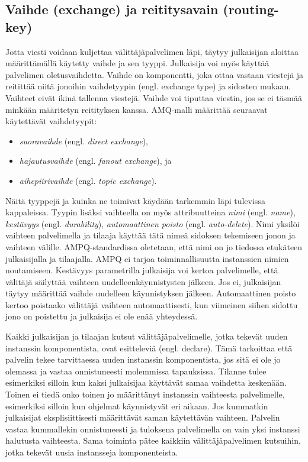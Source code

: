 \subsection{Vaihde (exchange) ja reititysavain (routing-key)}
Jotta viesti voidaan kuljettaa välittäjäpalvelimen läpi, täytyy julkaisijan aloittaa määrittämällä käytetty vaihde ja sen tyyppi. Julkaisija voi myös käyttää palvelimen oletusvaihdetta. Vaihde on komponentti, joka ottaa vastaan viestejä ja reitittää niitä jonoihin vaihdetyypin (engl. exchange type) ja sidosten mukaan. Vaihteet eivät ikinä tallenna viestejä. Vaihde voi tiputtaa viestin, jos se ei täsmää minkään määritetyn reitityksen kanssa. AMQ-malli määrittää seuraavat käytettävät vaihdetyypit:
\begin{itemize}
	\item \emph{suoravaihde} (engl. \emph{direct exchange}),
	\item \emph{hajautusvaihde} (engl. \emph{fanout exchange}), ja
	\item \emph{aihepiirivaihde} (engl. \emph{topic exchange}).
\end{itemize}

Näitä tyyppejä ja kuinka ne toimivat käydään tarkemmin läpi tulevissa kappaleissa. Tyypin lisäksi vaihteella on myös attribuutteina \emph{nimi} (engl. \emph{name}), \emph{kestävyys} (engl. \emph{durability}), \emph{automaattinen poisto} (engl. \emph{auto-delete}). Nimi yksilöi vaihteen palvelimella ja tilaaja käyttää tätä nimeä sidoksen tekemiseen jonon ja vaihteen välille. AMPQ-standardissa oletetaan, että nimi on jo tiedossa etukäteen julkaisijalla ja tilaajalla. AMPQ ei tarjoa toiminnallisuutta instanssien nimien noutamiseen. Kestävyys parametrilla julkaisija voi kertoa palvelimelle, että välitäjä säilyttää vaihteen uudelleenkäynnistysten jälkeen. Jos ei, julkaisijan täytyy määrittää vaihde uudelleen käynnistyksen jälkeen. Automaattinen poisto kertoo poistaako välittäjä vaihteen automaattisesti, kun viimeinen siihen sidottu jono on poistettu ja julkaisija ei ole enää yhteydessä.

Kaikki julkaisijan ja tilaajan kutsut välittäjäpalvelimelle, jotka tekevät uuden instanssin komponentista, ovat esitteleviä (engl. declare). Tämä tarkoittaa että palvelin tekee tarvittaessa uuden instanssin komponentista, jos sitä ei ole jo olemassa ja vastaa onnistuneesti molemmissa tapauksissa. Tilanne tulee esimerkiksi silloin kun kaksi julkaisijaa käyttävät samaa vaihdetta keskenään. Toinen ei tiedä onko toinen jo määrittänyt instanssin vaihteesta palvelimelle, esimerkiksi silloin kun ohjelmat käynnistyvät eri aikaan. Jos kummatkin julkaisijat eksplisiittisesti määrittävät saman käytettävän vaihteen. Palvelin vastaa kummallekin onnistuneesti ja tuloksena palvelimella on vain yksi instanssi halutusta vaihteesta. Sama toiminta pätee kaikkiin välittäjäpalvelimen kutsuihin, jotka tekevät uusia instansseja komponenteista.

